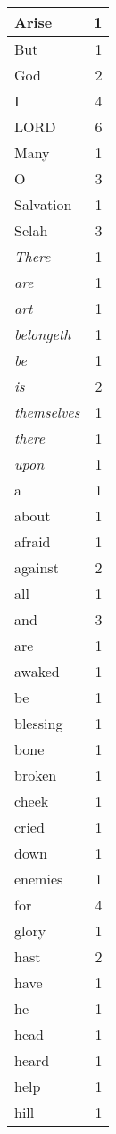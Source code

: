 \begin{center}
\begin{longtable}{l|r}
\hline \hline
\endlastfoot
Arise & 1 \\ \hline
But & 1 \\ \hline
God & 2 \\ \hline
I & 4 \\ \hline
LORD & 6 \\ \hline
Many & 1 \\ \hline
O & 3 \\ \hline
Salvation & 1 \\ \hline
Selah & 3 \\ \hline
\emph{There} & 1 \\ \hline
\emph{are} & 1 \\ \hline
\emph{art} & 1 \\ \hline
\emph{belongeth} & 1 \\ \hline
\emph{be} & 1 \\ \hline
\emph{is} & 2 \\ \hline
\emph{themselves} & 1 \\ \hline
\emph{there} & 1 \\ \hline
\emph{upon} & 1 \\ \hline
a & 1 \\ \hline
about & 1 \\ \hline
afraid & 1 \\ \hline
against & 2 \\ \hline
all & 1 \\ \hline
and & 3 \\ \hline
are & 1 \\ \hline
awaked & 1 \\ \hline
be & 1 \\ \hline
blessing & 1 \\ \hline
bone & 1 \\ \hline
broken & 1 \\ \hline
cheek & 1 \\ \hline
cried & 1 \\ \hline
down & 1 \\ \hline
enemies & 1 \\ \hline
for & 4 \\ \hline
glory & 1 \\ \hline
hast & 2 \\ \hline
have & 1 \\ \hline
he & 1 \\ \hline
head & 1 \\ \hline
heard & 1 \\ \hline
help & 1 \\ \hline
hill & 1 \\ \hline

\end{longtable}
\end{center}
